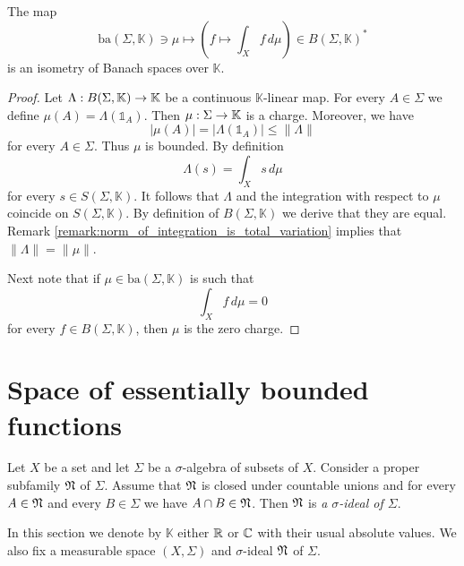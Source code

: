 \begin{theorem}\label{theorem:fichtenholz_kantorovich_for_bounded_functions}
    The map
    $$\mathrm{ba}(\Sigma,\mathbb{K})\ni \mu \mapsto \left(f\mapsto \int_Xf\,d\mu\right) \in B(\Sigma,\mathbb{K})^*$$
    is an isometry of Banach spaces over $\mathbb{K}$.
\end{theorem}
\begin{proof}
    Let $\Lambda:B(\Sigma,\mathbb{K})\rightarrow \mathbb{K}$ be a continuous $\mathbb{K}$-linear map. For every $A \in \Sigma$ we define $\mu(A) = \Lambda(\mathbb{1}_A)$. Then $\mu:\Sigma \rightarrow \mathbb{K}$ is a charge. Moreover, we have
    $$|\mu(A)| = \big|\Lambda(\mathbb{1}_A)\big| \leq \lVert \Lambda \rVert$$
    for every $A \in \Sigma$. Thus $\mu$ is bounded. By definition
    $$\Lambda(s) = \int_Xs\,d\mu$$
    for every $s \in S(\Sigma,\mathbb{K})$. It follows that $\Lambda$ and the integration with respect to $\mu$ coincide on $S(\Sigma,\mathbb{K})$. By definition of $B(\Sigma,\mathbb{K})$ we derive that they are equal. Remark \ref{remark:norm_of_integration_is_total_variation} implies that $\lVert \Lambda \rVert = \lVert \mu \rVert$.

    Next note that if $\mu \in \mathrm{ba}(\Sigma,\mathbb{K})$ is such that
    $$\int_Xf\,d\mu = 0$$
    for every $f \in B(\Sigma,\mathbb{K})$, then $\mu$ is the zero charge.
\end{proof}

\section{Space of essentially bounded functions}

\begin{definition}
    Let $X$ be a set and let $\Sigma$ be a $\sigma$-algebra of subsets of $X$. Consider a proper subfamily ${\mathfrak N}$ of $\Sigma$. Assume that ${\mathfrak N}$ is closed under countable unions and for every $A \in {\mathfrak N}$ and every $B \in \Sigma$ we have $A\cap B \in {\mathfrak N}$. Then ${\mathfrak N}$ is \textit{a $\sigma$-ideal of $\Sigma$}.
\end{definition}
\noindent
In this section we denote by $\mathbb{K}$ either ${\mathbb R}$ or ${\mathbb C}$ with their usual absolute values. We also fix a measurable space $(X,\Sigma)$ and $\sigma$-ideal ${\mathfrak N}$ of $\Sigma$.

